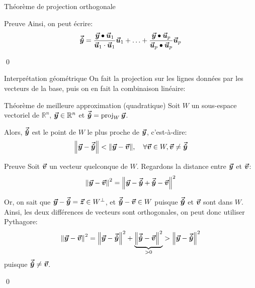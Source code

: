 \documentclass[a4paper]{article}
\begin{document}
\begin{parag}{Théorème de projection orthogonale}
\begin{subparag}{Preuve}
        Ainsi, on peut écrire:
        \[\bm{\protect\vec{\hat{y}}} = \frac{\bm{\protect\vec{y}} \bullet \bm{\protect\vec{u}}_1}{\bm{\protect\vec{u}}_1 \cdot \bm{\protect\vec{u}}_1} \bm{\protect\vec{u}}_1 + \ldots + \frac{\bm{\protect\vec{y}} \bullet \bm{\protect\vec{u}}_p}{\bm{\protect\vec{u}}_p \bullet \bm{\protect\vec{u}}_p} \bm{\protect\vec{u}}_p\]

        \qed
    \end{subparag}

    \begin{subparag}{Interprétation géométrique}
        On fait la projection sur les lignes données par les vecteurs de la base, puis on en fait la combinaison linéaire:
    \end{subparag}

\end{parag}

\begin{parag}{Théorème de meilleure approximation (quadratique)}
    Soit $W$ un sous-espace vectoriel de $\mathbb{R}^n$, $\bm{\protect\vec{y}} \in \mathbb{R}^n$ et $\bm{\protect\vec{\hat{y}}} = \operatorname{proj}_W \bm{\protect\vec{y}}$.

    Alors, $\bm{\protect\vec{\hat{y}}}$ est le point de $W$ le plus proche de $\bm{\protect\vec{y}}$, c'est-à-dire:
    \[\left\|\bvec{y} - \bvec{\hat{y}}\right\| < \left\|\bvec{y} - \bvec{v}\right\|, \mathspace \forall \bvec{v} \in W, \bvec{v} \neq \bvec{\hat{y}}\]

    \begin{subparag}{Preuve}
        Soit $\bm{\protect\vec{v}}$ un vecteur quelconque de $W$. Regardons la distance entre $\bm{\protect\vec{y}}$ et $\bm{\protect\vec{v}}$:
        \[\left\|\bvec{y} - \bvec{v}\right\|^2 = \left\|\bvec{y} - \bvec{\hat{y}} + \bvec{\hat{y}} - \bvec{v}\right\|^2\]

        Or, on sait que $\bm{\protect\vec{y}} - \bm{\protect\vec{\hat{y}}} = \bm{\protect\vec{z}} \in W^\perp$, et $\bm{\protect\vec{\hat{y}}} - \bm{\protect\vec{v}} \in W$ puisque $\bm{\protect\vec{\hat{y}}}$ et $\bm{\protect\vec{v}}$ sont dans $W$. Ainsi, les deux différences de vecteurs sont orthogonales, on peut donc utiliser Pythagore:
        \[\left\|\bvec{y} - \bvec{v}\right\|^2 = \left\|\bvec{y} - \bvec{\hat{y}}\right\|^2 + \underbrace{\left\|\bvec{\hat{y}} - \bvec{v}\right\|^2}_{> 0} > \left\|\bvec{y} - \bvec{\hat{y}}\right\|^2\]
        puisque $\bm{\protect\vec{\hat{y}}} \neq \bm{\protect\vec{v}}$.

        \qed
    \end{subparag}
\end{parag}
\end{document}
